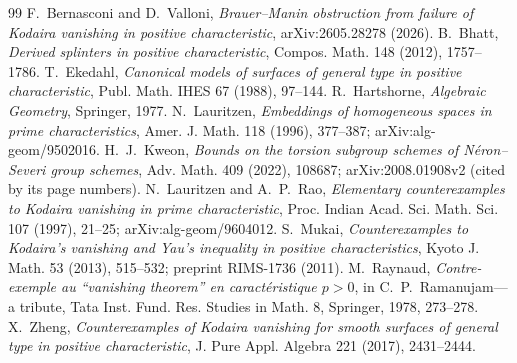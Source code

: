 \documentclass[11pt,a4paper]{article}
\theoremstyle{plain}
\theoremstyle{remark}
\begin{document}
\begin{thebibliography}{99}\small
{} F.~Bernasconi and D.~Valloni, \emph{Brauer--Manin obstruction from failure of Kodaira vanishing in positive
characteristic}, arXiv:2605.28278 (2026).
 B.~Bhatt, \emph{Derived splinters in positive characteristic}, Compos. Math. 148 (2012), 1757--1786.
 T.~Ekedahl, \emph{Canonical models of surfaces of general type in positive characteristic}, Publ. Math.
IHES 67 (1988), 97--144.
 R.~Hartshorne, \emph{Algebraic Geometry}, Springer, 1977.
 N.~Lauritzen, \emph{Embeddings of homogeneous spaces in prime characteristics}, Amer. J. Math. 118
(1996), 377--387; arXiv:alg-geom/9502016.
 H.~J.~Kweon, \emph{Bounds on the torsion subgroup schemes of N\'eron--Severi group schemes}, Adv. Math.
409 (2022), 108687; arXiv:2008.01908v2 (cited by its page numbers).
 N.~Lauritzen and A.~P.~Rao, \emph{Elementary counterexamples to Kodaira vanishing in prime
characteristic}, Proc. Indian Acad. Sci. Math. Sci. 107 (1997), 21--25; arXiv:alg-geom/9604012.
 S.~Mukai, \emph{Counterexamples to Kodaira's vanishing and Yau's inequality in positive
characteristics}, Kyoto J. Math. 53 (2013), 515--532; preprint RIMS-1736 (2011).
 M.~Raynaud, \emph{Contre-exemple au ``vanishing theorem'' en caract\'eristique $p>0$}, in
C.~P.~Ramanujam---a tribute, Tata Inst. Fund. Res. Studies in Math. 8, Springer, 1978, 273--278.
 X.~Zheng, \emph{Counterexamples of Kodaira vanishing for smooth surfaces of general type in positive
characteristic}, J. Pure Appl. Algebra 221 (2017), 2431--2444.
\end{thebibliography}
\end{document}

